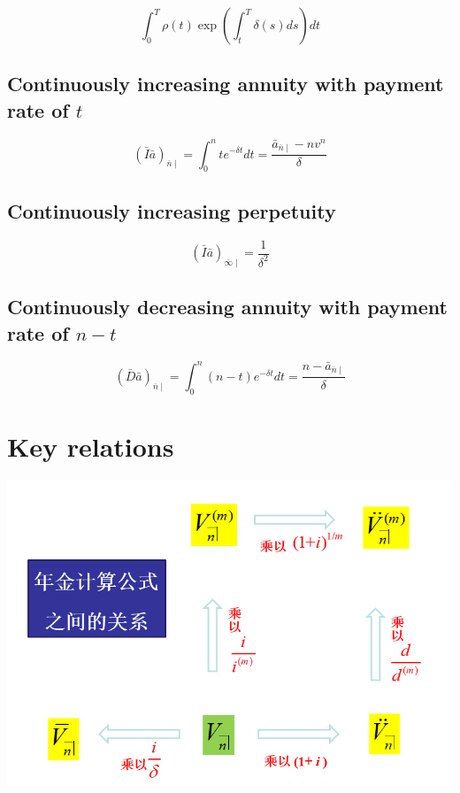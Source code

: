 \documentclass[
]{book}
\begin{document}
\[\int_0^{T}\rho(t)\exp\left(\int_t^T\delta(s)ds\right)dt\]

\hypertarget{continuously-increasing-annuity-with-payment-rate-of-t}{%
\subsection*{\texorpdfstring{Continuously increasing annuity with payment rate of \(t\)}{Continuously increasing annuity with payment rate of t}}\label{continuously-increasing-annuity-with-payment-rate-of-t}}

\[(\bar{I}\bar{a})_{\overline{n}\mid}=\int_0^nte^{-\delta t}dt=\frac{\bar{a}_{\overline{n}\mid}-nv^n}{\delta}\]

\hypertarget{continuously-increasing-perpetuity}{%
\subsection*{Continuously increasing perpetuity}\label{continuously-increasing-perpetuity}}

\[(\bar{I}\bar{a})_{\overline{\infty}\mid}=\frac{1}{\delta^2}\]

\hypertarget{continuously-decreasing-annuity-with-payment-rate-of-n-t}{%
\subsection*{\texorpdfstring{Continuously decreasing annuity with payment rate of \(n-t\)}{Continuously decreasing annuity with payment rate of n-t}}\label{continuously-decreasing-annuity-with-payment-rate-of-n-t}}

\[(\bar{D}\bar{a})_{\overline{n}\mid}=\int_0^n (n-t) e^{-\delta t}dt=\frac{n-\bar{a}_{\overline{n}\mid}}{\delta}\]

\hypertarget{key-relations}{%
\section{Key relations}\label{key-relations}}

\begin{center}\includegraphics[width=0.5\linewidth]{./plots/annuity-2} \end{center}
\end{document}
